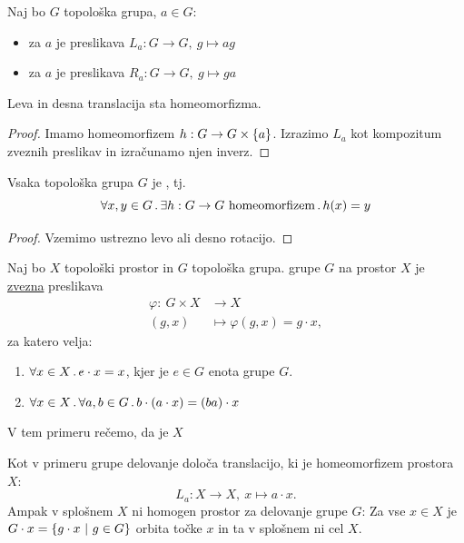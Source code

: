 \begin{definicija}
    Naj bo \(G\) topološka grupa, \(a \in G\):
    \begin{itemize}
        \item {} za \(a\) je preslikava \(L_a: G \to G, \ g \mapsto ag\)
        \item {} za \(a\) je preslikava \(R_a: G \to G, \ g \mapsto ga\)
    \end{itemize}
\end{definicija}

\begin{trditev}
    Leva in desna translacija sta homeomorfizma.
\end{trditev}

\begin{proof}
    Imamo homeomorfizem \(h: G \to G \times \left\{a\right\}\). Izrazimo \(L_a\) kot kompozitum zveznih preslikav in izračunamo njen inverz.
\end{proof}

\begin{posledica}
    Vsaka topološka grupa \(G\) je , tj.
    \[\forall x, y \in G \,.\, \exists h: G \to G \ \text{homeomorfizem} \,.\, h(x) = y\]
\end{posledica}

\begin{proof}
    Vzemimo ustrezno levo ali desno rotacijo.
\end{proof}

\begin{definicija}
    Naj bo \(X\) topološki prostor in \(G\) topološka grupa.  grupe \(G\) na prostor \(X\) je \underline{zvezna} preslikava
    \begin{align*}
        \varphi: \ G \times X &\longrightarrow X \\
        (g, x) &\longmapsto \varphi(g,x) = g \cdot x,
    \end{align*}
    za katero velja:
    \begin{enumerate}
        \item \(\forall x \in X \,.\, e \cdot x = x\), kjer je \(e \in G\) enota grupe \(G\).
        \item \(\forall x \in X \,.\, \forall a, b \in G \,.\, b\cdot(a \cdot x) = (ba) \cdot x\)
    \end{enumerate}
    V tem primeru rečemo, da je \(X\) 
\end{definicija}

\begin{opomba}
    Kot v primeru grupe delovanje določa translacijo, ki je homeomorfizem prostora \(X\): 
    \[L_a: X \to X, \ x \mapsto a \cdot x.\]
    Ampak v splošnem \(X\) ni homogen prostor za delovanje grupe \(G\): Za vse \(x \in X\) je \(G \cdot x = \left\{g \cdot x \ | \ g \in G\right\}\) orbita točke \(x\) in ta v splošnem ni cel \(X\). 
\end{opomba}

